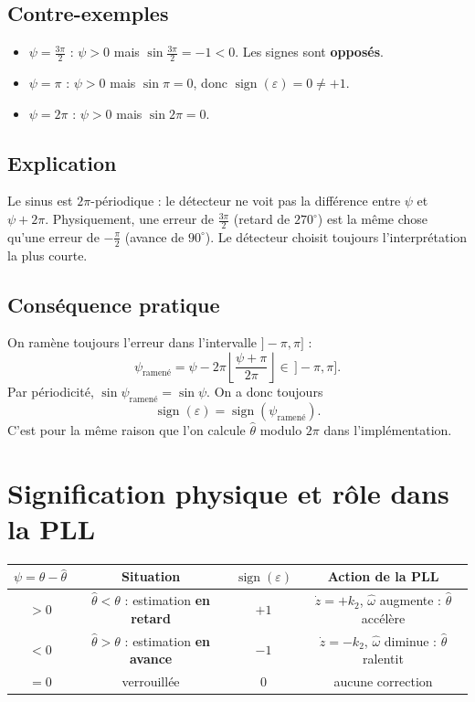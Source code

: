 \documentclass[11pt,a4paper]{article}
\numberwithin{equation}{section}
\theoremstyle{plain}
\theoremstyle{definition}
\newcommand{\sign}{\operatorname{sign}}
\newcommand{\hth}{\hat{\theta}}
\begin{document}
\subsection{Contre-exemples}
\begin{itemize}
  \item $\psi = \frac{3\pi}{2}$ : $\psi>0$ mais $\sin\frac{3\pi}{2} = -1<0$. Les signes sont \textbf{opposés}.
  \item $\psi = \pi$ : $\psi>0$ mais $\sin\pi = 0$, donc $\sign(\varepsilon) = 0\neq+1$.
  \item $\psi = 2\pi$ : $\psi>0$ mais $\sin 2\pi = 0$.
\end{itemize}

\subsection{Explication}
Le sinus est $2\pi$-périodique : le détecteur ne \og voit\fg{} pas la différence entre $\psi$ et $\psi+2\pi$.
Physiquement, une erreur de $\frac{3\pi}{2}$ (retard de $270^\circ$) est la même chose qu'une erreur de
$-\frac{\pi}{2}$ (avance de $90^\circ$). Le détecteur choisit toujours l'interprétation la plus courte.

\subsection{Conséquence pratique}
On ramène toujours l'erreur dans l'intervalle $]-\pi,\pi]$ :
\begin{equation}
\psi_{\text{ramené}} = \psi - 2\pi\left\lfloor\frac{\psi+\pi}{2\pi}\right\rfloor\in\,]-\pi,\pi] .
\end{equation}
Par périodicité, $\sin\psi_{\text{ramené}} = \sin\psi$. On a donc toujours
\begin{equation}
\sign(\varepsilon) = \sign(\psi_{\text{ramené}}).
\end{equation}
C'est pour la même raison que l'on calcule $\hth$ modulo $2\pi$ dans l'implémentation.

\section{Signification physique et rôle dans la PLL}

\begin{center}
\renewcommand{\arraystretch}{1.4}
\begin{tabular}{|c|c|c|c|}
\hline
$\psi=\theta-\hth$ & Situation & $\sign(\varepsilon)$ & Action de la PLL \\
\hline
$>0$ & $\hth<\theta$ : estimation \textbf{en retard} & $+1$ & $\dot z = +k_2$, $\hat\omega$ augmente : $\hth$ accélère\\
$<0$ & $\hth>\theta$ : estimation \textbf{en avance} & $-1$ & $\dot z = -k_2$, $\hat\omega$ diminue : $\hth$ ralentit\\
$=0$ & verrouillée & $0$ & aucune correction\\
\hline
\end{tabular}
\end{center}
\end{document}
